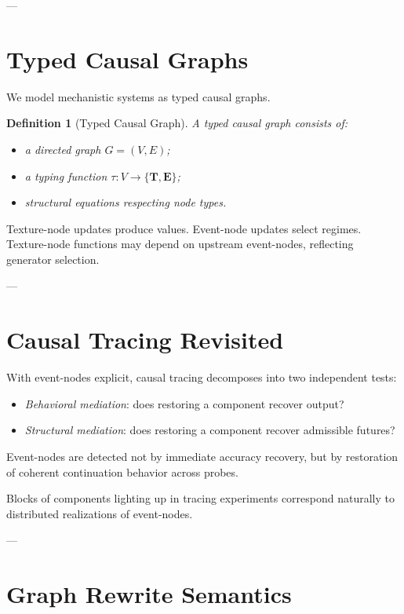 \documentclass[11pt]{article}
\newtheorem{definition}{Definition}
\theoremstyle{remark}
\newcommand{\Tnode}{\mathbf{T}}
\newcommand{\Enode}{\mathbf{E}}
\begin{document}
---

\section{Typed Causal Graphs}

We model mechanistic systems as typed causal graphs.

\begin{definition}[Typed Causal Graph]
A typed causal graph consists of:
\begin{itemize}
\item a directed graph \(G=(V,E)\);
\item a typing function \(\tau: V \to \{\Tnode, \Enode\}\);
\item structural equations respecting node types.
\end{itemize}
\end{definition}

Texture-node updates produce values. Event-node updates select regimes. Texture-node functions may depend on upstream event-nodes, reflecting generator selection.

---

\section{Causal Tracing Revisited}

With event-nodes explicit, causal tracing decomposes into two independent tests:
\begin{itemize}
\item \emph{Behavioral mediation}: does restoring a component recover output?
\item \emph{Structural mediation}: does restoring a component recover admissible futures?
\end{itemize}

Event-nodes are detected not by immediate accuracy recovery, but by restoration of coherent continuation behavior across probes.

Blocks of components lighting up in tracing experiments correspond naturally to distributed realizations of event-nodes.

---

\section{Graph Rewrite Semantics}
\end{document}
